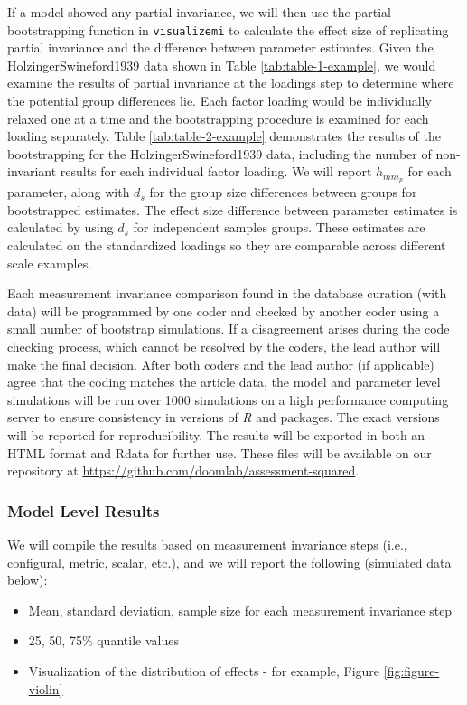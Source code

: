 \documentclass[
  man]{apa7}
\providecommand{\tightlist}{%
  \setlength{\itemsep}{0pt}\setlength{\parskip}{0pt}}
\begin{document}
If a model showed any partial invariance, we will then use the partial bootstrapping function in \texttt{visualizemi} to calculate the effect size of replicating partial invariance and the difference between parameter estimates. Given the HolzingerSwineford1939 data shown in Table \ref{tab:table-1-example}, we would examine the results of partial invariance at the loadings step to determine where the potential group differences lie. Each factor loading would be individually relaxed one at a time and the bootstrapping procedure is examined for each loading separately. Table \ref{tab:table-2-example} demonstrates the results of the bootstrapping for the HolzingerSwineford1939 data, including the number of non-invariant results for each individual factor loading. We will report \(h_{mni_p}\) for each parameter, along with \(d_s\) for the group size differences between groups for bootstrapped estimates. The effect size difference between parameter estimates is calculated by using \(d_s\) for independent samples groups. These estimates are calculated on the standardized loadings so they are comparable across different scale examples.

Each measurement invariance comparison found in the database curation (with data) will be programmed by one coder and checked by another coder using a small number of bootstrap simulations. If a disagreement arises during the code checking process, which cannot be resolved by the coders, the lead author will make the final decision. After both coders and the lead author (if applicable) agree that the coding matches the article data, the model and parameter level simulations will be run over 1000 simulations on a high performance computing server to ensure consistency in versions of \emph{R} and packages. The exact versions will be reported for reproducibility. The results will be exported in both an HTML format and Rdata for further use. These files will be available on our repository at \url{https://github.com/doomlab/assessment-squared}.

\subsubsection{Model Level Results}\label{model-level-results}

We will compile the results based on measurement invariance steps (i.e., configural, metric, scalar, etc.), and we will report the following (simulated data below):

\begin{itemize}
\tightlist
\item
  Mean, standard deviation, sample size for each measurement invariance step
\item
  25, 50, 75\% quantile values
\item
  Visualization of the distribution of effects - for example, Figure \ref{fig:figure-violin}
\end{itemize}
\end{document}

